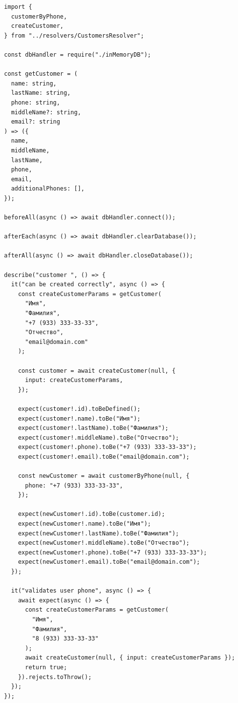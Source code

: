 \documentclass[a4paper,article,14pt]{extarticle}
\begin{document}
\begin{verbatim}
  import {
    customerByPhone,
    createCustomer,
  } from "../resolvers/CustomersResolver";
  
  const dbHandler = require("./inMemoryDB");
  
  const getCustomer = (
    name: string,
    lastName: string,
    phone: string,
    middleName?: string,
    email?: string
  ) => ({
    name,
    middleName,
    lastName,
    phone,
    email,
    additionalPhones: [],
  });
  
  beforeAll(async () => await dbHandler.connect());
  
  afterEach(async () => await dbHandler.clearDatabase());
  
  afterAll(async () => await dbHandler.closeDatabase());
  
  describe("customer ", () => {
    it("can be created correctly", async () => {
      const createCustomerParams = getCustomer(
        "Имя",
        "Фамилия",
        "+7 (933) 333-33-33",
        "Отчество",
        "email@domain.com"
      );
  
      const customer = await createCustomer(null, {
        input: createCustomerParams,
      });
  
      expect(customer!.id).toBeDefined();
      expect(customer!.name).toBe("Имя");
      expect(customer!.lastName).toBe("Фамилия");
      expect(customer!.middleName).toBe("Отчество");
      expect(customer!.phone).toBe("+7 (933) 333-33-33");
      expect(customer!.email).toBe("email@domain.com");
  
      const newCustomer = await customerByPhone(null, {
        phone: "+7 (933) 333-33-33",
      });
  
      expect(newCustomer!.id).toBe(customer.id);
      expect(newCustomer!.name).toBe("Имя");
      expect(newCustomer!.lastName).toBe("Фамилия");
      expect(newCustomer!.middleName).toBe("Отчество");
      expect(newCustomer!.phone).toBe("+7 (933) 333-33-33");
      expect(newCustomer!.email).toBe("email@domain.com");
    });
  
    it("validates user phone", async () => {
      await expect(async () => {
        const createCustomerParams = getCustomer(
          "Имя",
          "Фамилия",
          "8 (933) 333-33-33"
        );
        await createCustomer(null, { input: createCustomerParams });
        return true;
      }).rejects.toThrow();
    });
  });
  
\end{verbatim}
\end{document}
